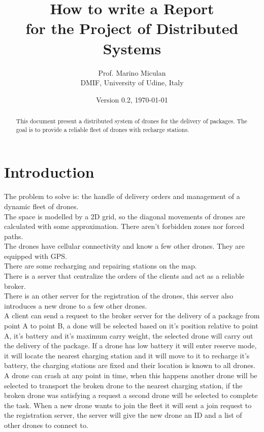 \documentclass{memoir}
\title{How to write a Report\\ for the Project of Distributed Systems}
\author{Prof. Marino Miculan\\ DMIF, University of Udine, Italy}
\date{Version 0.2, \today}
\begin{document}
\maketitle
\begin{abstract}
This document present a distributed system of drones for the delivery of packages. The goal is to provide a reliable fleet of drones with recharge stations.
\end{abstract}

\chapter{Introduction}\label{ch:intro}

The problem to solve is: the handle of delivery orders and management of a dynamic fleet of drones.\\
The space is modelled by a 2D grid, so the diagonal movements of drones are calculated with some approximation. There aren't forbidden zones nor forced paths.\\
The drones have cellular connectivity and know a few other drones. They are equipped with GPS.\\
There are some recharging and repairing stations on the map.\\
There is a server that centralize the orders of the clients and act as a reliable broker.\\
There is an other server for the registration of the drones, this server also introduces a new drone to a few other drones.
\\

A client can send a request to the broker server for the delivery of a package from point A to point B, a done will be selected based on it's position relative to point A, it's  battery and it's maximum carry weight, the selected drone will carry out the delivery of the package.
If a drone has low battery it will enter reserve mode, it will locate the nearest charging station and it will move to it to recharge it's battery, the charging stations are fixed and their location is known to all drones.
A drone can crash at any point in time, when this happens another drone will be selected to transport the broken drone to the nearest charging station, if the broken drone was satisfying a request a second drone will be selected to complete the task.
When a new drone wants to join the fleet it will sent a join request to the registration server, the server will give the new drone an ID and a list of other drones to connect to.
\end{document}
